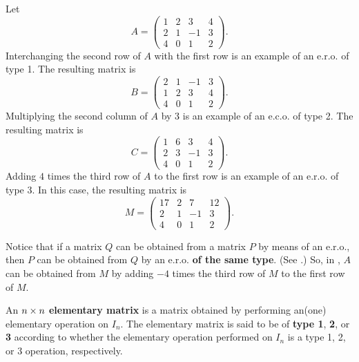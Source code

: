\begin{example} \label{example 3.1.1}
Let
\[
    A = \begin{pmatrix}
        1 & 2 & 3 & 4 \\
        2 & 1 & -1 & 3 \\
        4 & 0 & 1 & 2
    \end{pmatrix}.
\]
Interchanging the second row of \(A\) with the first row is an example of an e.r.o. of type 1. 
The resulting matrix is
\[
    B = \begin{pmatrix}
        2 & 1 & -1 & 3 \\
        1 & 2 & 3 & 4 \\
        4 & 0 & 1 & 2
    \end{pmatrix}.
\]
Multiplying the second column of \(A\) by \(3\) is an example of an e.c.o. of type 2.
The resulting matrix is
\[
    C = \begin{pmatrix}
        1 & 6 & 3 & 4 \\
        2 & 3 & -1 & 3 \\
        4 & 0 & 1 & 2
    \end{pmatrix}.
\]
Adding \(4\) times the third row of \(A\) to the first row is an example of an e.r.o. of type 3.
In this case, the resulting matrix is
\[
    M = \begin{pmatrix}
        17 & 2 & 7 & 12 \\
        2 & 1 & -1 & 3 \\
        4 & 0 & 1 & 2
    \end{pmatrix}.
\]
\end{example}

\begin{remark} \label{remark 3.1.1}
Notice that if a matrix \(Q\) can be obtained from a matrix \(P\) by means of an e.r.o., 
then \(P\) can be obtained from \(Q\) by an e.r.o. \textbf{of the same type}.
(See .)
So, in , \(A\) can be obtained from \(M\) by adding \(-4\) times the third row of \(M\) to the first row of \(M\).
\end{remark}

\begin{definition} \label{def 3.2}
An \(n \times n\) \textbf{elementary matrix} is a matrix obtained by performing an(one) elementary operation on \(I_n\).
The elementary matrix is said to be of \textbf{type 1}, \textbf{2}, or \textbf{3} according to whether the elementary operation
performed on \(I_n\) is a type 1, 2, or 3 operation, respectively.
\end{definition}

